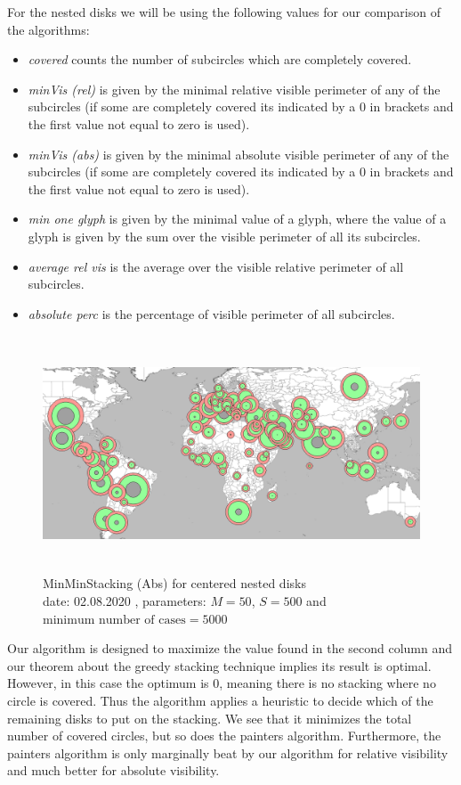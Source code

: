 \documentclass[a4paper,11pt]{article}
\begin{document}
For the nested disks we will be using the following values for our comparison of the algorithms:
\begin{itemize}
  \item \textit{covered} counts the number of subcircles which are completely covered.
  \item \textit{minVis (rel)} is given by the minimal relative visible perimeter of any of the subcircles (if some are completely covered its indicated by a 0 in brackets and the first value not equal to zero is used).
  \item \textit{minVis (abs)} is given by the minimal absolute visible perimeter of any of the subcircles (if some are completely covered its indicated by a 0 in brackets and the first value not equal to zero is used).
  \item \textit{min one glyph} is given by the minimal value of a glyph, where the value of a glyph is given by the sum over the visible perimeter of all its subcircles.
  \item \textit{average rel vis} is the average over the visible relative perimeter of all subcircles.
  \item \textit{absolute perc} is the percentage of visible perimeter of all subcircles.
\end{itemize}

\begin{figure}[!t]
  \centering
  \includegraphics[height=7cm]{assets/MinMinAbsEval}
  \caption{MinMinStacking (Abs) for centered nested disks\\
    date: 02.08.2020  , parameters: $M=50$, $S=500$ and $\text{minimum number of cases}=5000$  }
\end{figure}




Our algorithm is designed to maximize the value found in the second column and our theorem about the greedy stacking technique implies its result is optimal. However, in this case the optimum is 0, meaning there is no stacking where no circle is covered. Thus the algorithm applies a heuristic to decide which of the remaining disks to put on the stacking. We see that it minimizes the total number of covered circles, but so does the painters algorithm. Furthermore, the painters algorithm is only marginally beat by our algorithm for relative visibility and much better for absolute visibility.
\end{document}

